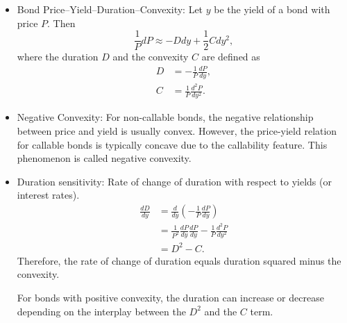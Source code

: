 \documentclass{amsart}
\theoremstyle{plain}
\numberwithin{equation}{section}
\begin{document}
\begin{itemize}
gives better estimate of credit volatility than using spread duration. If $s$ is the 
spread and $D_s$ the spread duration of a credit security, the spread return $r_{spread}$ can be approximated
as 
\begin{equation}
r_{spread} \simeq -D_s \Delta s,
\end{equation}
or equivalently, after multiplying and dividing by 
$s$, as, 
\begin{equation}
r_{spread} \simeq -D_s  \times s \left( \frac{ \Delta s}{s} \right).
\end{equation}
Empirically, the markets have shown the last 
equation above is a better approximation, especially
for volatility prediction of $r_{spread}$ and hence 
$D_s  \times s$ (DTS) is a better measure of credit risk. 

\item Bond Price--Yield--Duration--Convexity:
Let $y$ be the yield of a bond with price $P$. Then  
\begin{equation}
\frac{1}{P} dP \approx -D dy + \frac{1}{2} C dy^2,
\end{equation}
where the duration $D$ and the convexity 
$C$ are defined as
\begin{align*}
D &= -\frac{1}{P}\frac{dP}{dy},\\
C &=  \frac{1}{P}\frac{d^2P}{dy^2}.
\end{align*}

\item Negative Convexity: For non-callable bonds, the negative relationship between price and 
yield is usually convex. However, the price-yield relation for callable bonds
is typically concave due to the callability feature. This phenomenon is called
negative convexity.

\item Duration sensitivity: Rate of change of duration with respect to 
yields (or interest rates). 
\begin{align*}
\frac{dD}{dy} &= \frac{d}{dy}\left(-\frac{1}{P}\frac{dP}{dy}\right)\\
&=  \frac{1}{P^{2}}\frac{dP}{dy}\frac{dP}{dy} - \frac{1}{P}\frac{d^{2}P}{dy^{2}}\\
&= D^{2} - C.
\end{align*}
Therefore, the rate of change of duration equals duration squared 
minus the convexity. 

For bonds with positive convexity, the duration can increase or decrease 
depending on the interplay between the $D^{2}$ and the $C$ term. 


\end{itemize}
\end{document}
